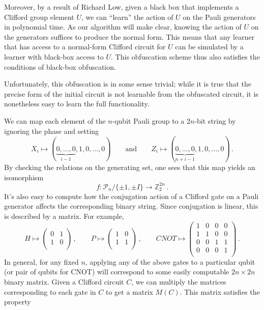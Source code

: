 \documentclass[11pt]{article}
\numberwithin{equation}{section}
\newcommand{\Z}{\mathbb{Z}}
\begin{document}
{Moreover, by a result of Richard Low, given a black box that implements a Clifford group element $U$, we can ``learn'' the action of $U$ on the Pauli generators in polynomial time. As our algorithm will make clear, knowing the action of $U$ on the generators suffices to produce the normal form. This means that any learner that has access to a normal-form Clifford circuit for $U$ can be simulated by a learner with black-box access to $U$. This obfuscation scheme thus also satisfies the conditions of black-box obfuscation.

Unfortunately, this obfuscation is in some sense trivial; while it is true that the precise form of the initial circuit is not learnable from the obfuscated circuit, it is nonetheless easy to learn the full functionality.

We can map each element of the $n$-qubit Pauli group to a $2n$-bit string by ignoring the phase and setting
$$
X_i \mapsto (\underbrace{0, \dots, 0}_{i-1}, 1, 0, \dots, 0)
\qquad \text{and} \qquad
Z_i \mapsto (\underbrace{0, \dots, 0}_{n+i-1}, 1, 0, \dots, 0)\,.
$$
By checking the relations on the generating set, one sees that this map yields an isomorphism
$$
f: \mathcal P_n / \{\pm 1, \pm I\} \rightarrow \Z_2^{2n}\,.
$$
It's also easy to compute how the conjugation action of a Clifford gate on a Pauli generator affects the corresponding binary string. Since conjugation is linear, this is described by a matrix. For example,
$$
H \mapsto
\begin{pmatrix}
0 & 1 \\
1 & 0 \\
\end{pmatrix}\,,
\qquad
P \mapsto
\begin{pmatrix}
1 & 0 \\
1 & 1 \\
\end{pmatrix}\,,
\qquad
CNOT \mapsto
\begin{pmatrix}
1 & 0 & 0 & 0\\
1 & 1 & 0 & 0\\
0 & 0 & 1 & 1\\
0 & 0 & 0 & 1\\
\end{pmatrix}\,.
$$
In general, for any fixed $n$, applying any of the above gates to a particular qubit (or pair of qubits for CNOT) will correspond to some easily computable $2n \times 2n$ binary matrix. Given a Clifford circuit $C$, we can multiply the matrices corresponding to each gate in $C$ to get a matrix $M(C)$. This matrix satisfies the property
}
\end{document}
